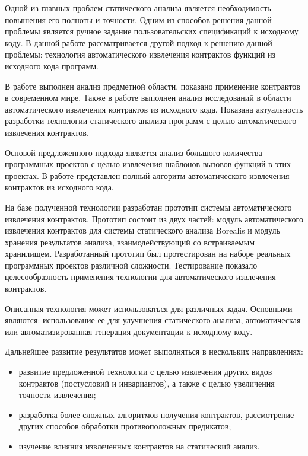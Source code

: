 \conclusion
Одной из главных проблем статического анализа является необходимость повышения его полноты и точности. Одним из способов решения данной проблемы является ручное задание пользовательских спецификаций к исходному коду. В данной работе рассматривается другой подход к решению данной проблемы: технология автоматического извлечения контрактов функций из исходного кода программ.

В работе выполнен анализ предметной области, показано применение контрактов в современном мире. Также в работе выполнен анализ исследований в области автоматического извлечения контрактов из исходного кода. Показана актуальность разработки технологии статического анализа программ с целью автоматического извлечения контрактов.

Основой предложенного подхода является анализ большого количества программных проектов с целью извлечения шаблонов вызовов функций в этих проектах. В работе представлен полный алгоритм автоматического извлечения контрактов из исходного кода.

На базе полученной технологии разработан прототип системы автоматического извлечения контрактов. Прототип состоит из двух частей: модуль автоматического извлечения контрактов для системы статического анализа Borealis и модуль хранения результатов анализа, взаимодействующий со встраиваемым хранилищем. Разработанный прототип был протестирован на наборе реальных программных проектов различной сложности. Тестирование показало целесообразность применения технологии для автоматического извлечения контрактов.

Описанная технология может использоваться для различных задач. Основными являются: использование ее для улучшения статического анализа, автоматическая или автоматизированная генерация документации к исходному коду.

Дальнейшее развитие результатов может выполняться в нескольких направлениях:
\begin{itemize}
\item развитие предложенной технологии с целью извлечения других видов контрактов (постусловий и инвариантов), а также с целью увеличения точности извлечения;
\item разработка более сложных алгоритмов получения контрактов, рассмотрение других способов обработки противоположных предикатов;
\item изучение влияния извлеченных контрактов на статический анализ.
\end{itemize}